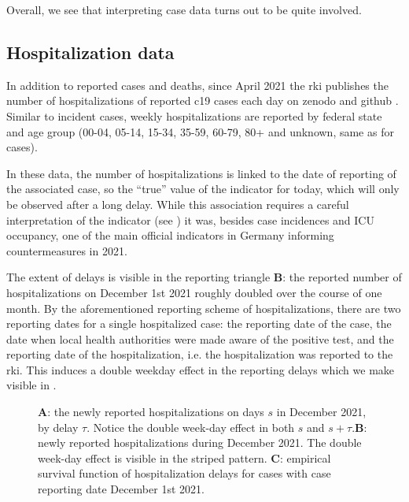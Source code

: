 Overall, we see that interpreting case data turns out to be quite involved. 

\subsection{Hospitalization data}
In addition to reported cases and deaths, since April 2021 the \acrshort{rki} publishes the number of hospitalizations of reported \acrshort{c19} cases each day on zenodo \citep{RobertKoch-Institut2024COVID19Hospitalisierungen} and github \citep{RobertKoch-Institut2024COVID19Hospitalisierungena}. 
Similar to incident cases, weekly hospitalizations are reported by federal state and age group (00-04, 05-14, 15-34, 35-59, 60-79, 80+ and unknown, same as for cases). 

In these data, the number of hospitalizations is linked to the date of reporting of the associated case, so the ``true'' value of the indicator for today, which will only be observed after a long delay. While this association requires a careful interpretation of the indicator (see ) it was, besides case incidences and ICU occupancy, one of the main official indicators in Germany informing countermeasures in 2021.

The extent of delays is visible in the reporting triangle  \textbf{B}: the reported number of hospitalizations on December 1st 2021 roughly doubled over the course of one month. By the aforementioned reporting scheme of hospitalizations, there are two reporting dates for a single hospitalized case: the reporting date of the case, the date when local health authorities were made aware of the positive test, and the reporting date of the hospitalization, i.e. the hospitalization was reported to the \acrshort{rki}. This induces a double weekday effect in the reporting delays which we make visible in .

\begin{figure}
    \resizebox{\textwidth}{!}{%
    }
    \caption{\textbf{A}: the newly reported hospitalizations on days $s$ in December 2021, by delay $\tau$. Notice the double week-day effect in both $s$ and $s+\tau$.\textbf{B}: newly reported hospitalizations during December 2021. The double week-day effect is visible in the striped pattern. \textbf{C}: empirical survival function of hospitalization delays for cases with case reporting date December 1st 2021.}
    \label{fig:double_weekday_effect_hosp}
\end{figure}

